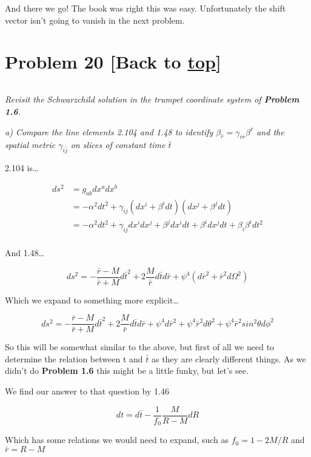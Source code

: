 \documentclass[landscape,letterpaper,10pt,english]{article}
\begin{document}
And there we go! The book was right this was easy. Unfortunately the
shift vector isn't going to vanish in the next problem.

    \hypertarget{problem-20-back-to-top}{%
\section{\texorpdfstring{Problem 20 {[}Back to
\hyperref[toc]{top}{]}}{Problem 20 {[}Back to {]}}}\label{problem-20-back-to-top}}

\[\label{P20}\]

\emph{Revisit the Schwarzchild solution in the trumpet coordinate system
of \textbf{Problem 1.6}.}

\emph{a) Compare the line elements 2.104 and 1.48 to identify
\(\beta_{\bar r} = \gamma_{\bar r \bar r} \beta^{\bar r}\) and the
spatial metric \(\gamma_{\bar i \bar j}\) on slices of constant time
\(\bar t\)}

    2.104 is\ldots{}

\[
\begin{align}
ds^2 &= g_{ab}dx^adx^b \\
&= -\alpha^2 dt^2 + \gamma_{ij}(dx^i + \beta^i dt)(dx^j + \beta^j dt) \\
&= -\alpha^2 dt^2 + \gamma_{ij}dx^idx^j + \beta^j dx^i dt + \beta^i dx^j dt + \beta_i\beta^i dt^2 \\
\end{align}
\]

And 1.48\ldots{}

\[ ds^2 = -\frac{\bar{r} - M}{\bar{r} + M} d\bar{t}^2 + 2\frac{M}{\bar r}d\bar{t}d\bar{r} + \psi^4 (d\bar{r}^2 + \bar{r}^2 d\Omega^2) \]

Which we expand to something more explicit\ldots{}

\[ ds^2 = -\frac{\bar{r} - M}{\bar{r} + M} d\bar{t}^2 + 2\frac{M}{\bar r}d\bar{t}d\bar{r} + \psi^4 d\bar{r}^2 + \psi^4 \bar{r}^2 d\theta^2 + \psi^4 \bar{r}^2 sin^2\theta d\phi^2 \]

So this will be somewhat similar to the above, but first of all we need
to determine the relation between t and \(\bar t\) as they are clearly
different things. As we didn't do \textbf{Problem 1.6} this might be a
little funky, but let's see.

We find our answer to that question by 1.46

\[ dt = d\bar{t} -\frac{1}{f_0} \frac{M}{R-M}dR \]

Which has some relations we would need to expand, such as
\(f_0 = 1-2M/R\) and \(\bar{r} = R-M\)
\end{document}
